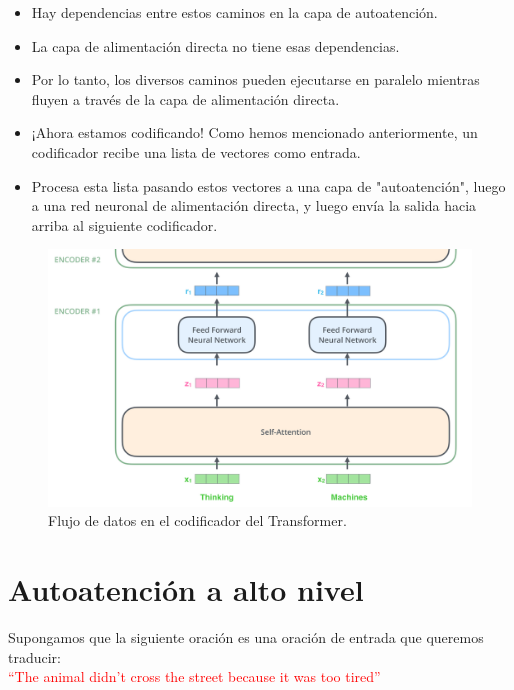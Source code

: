\begin{itemize}
\item Hay dependencias entre estos caminos en la capa de autoatención.

\item La capa de alimentación directa no tiene esas dependencias.

\item Por lo tanto, los diversos caminos pueden ejecutarse en paralelo mientras fluyen a través de la capa de alimentación directa.

\item ¡Ahora estamos codificando! Como hemos mencionado anteriormente, un codificador recibe una lista de vectores como entrada.

\item Procesa esta lista pasando estos vectores a una capa de "autoatención", luego a una red neuronal de alimentación directa, y luego envía la salida hacia arriba al siguiente codificador.

\end{itemize}

\begin{figure}[h]
\centering
\includegraphics[scale=0.2]{pics/encoder_with_tensors_2.png}
\caption{Flujo de datos en el codificador del Transformer.}
\end{figure}


\section{Autoatención a alto nivel}

Supongamos que la siguiente oración es una oración de entrada que queremos traducir:
\\ \textcolor{red}{``The animal didn't cross the street because it was too tired''}

